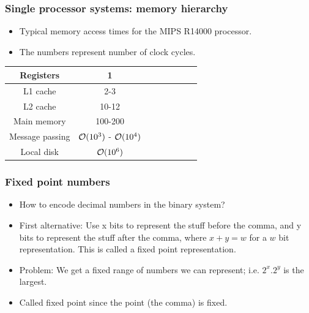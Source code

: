 \documentclass{beamer}
\begin{document}
\begin{frame}\frametitle{Single processor systems: memory hierarchy}
\begin{center}
  \begin{itemize}
    \item Typical memory access times for the MIPS R14000 processor. \\
    \item The numbers represent number of clock cycles. 
    \end{itemize}
  \end{center}
  \vspace{.5cm}

  \begin{center}
    \begin{tabular}{|c|c|c|c|c|c|c|c|} \hline
      Registers & 1
        \\ \hline
      L1 cache & 2-3
        \\ \hline
      L2 cache & 10-12
        \\ \hline
      Main memory &  100-200
        \\ \hline
      Message passing & ${\cal O}(10^3)$ - ${\cal O}(10^4)$
      \\ \hline
      Local disk & ${\cal O}(10^6)$
        \\ \hline
    \end{tabular}
  \end{center}
\end{frame}

\begin{frame}\frametitle{Fixed point numbers}
  \begin{itemize}
    \item How to encode decimal numbers in the binary system?
    \item First alternative: Use x bits to represent the stuff before the comma, and
          y bits to represent the stuff after the comma, where $x+y = w$ for a $w$ bit representation.
          This is called a fixed point representation.
    \item Problem: We get a fixed range of numbers we can represent; i.e. $2^x.2^y$ is the largest.
    \item Called fixed point since the point (the comma) is fixed.
  \end{itemize}
\end{frame}
\end{document}
